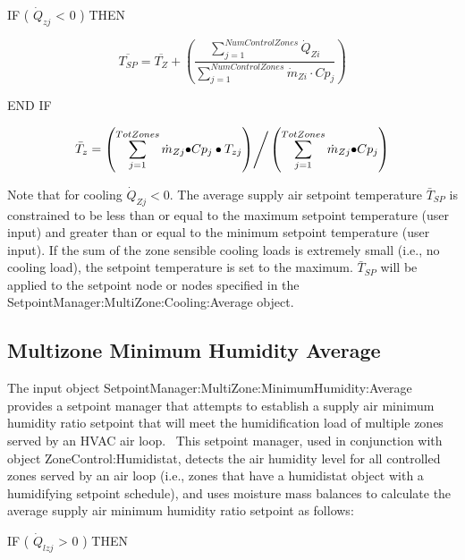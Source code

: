 IF ( \({\dot Q_{zj}}\) \textless{} 0 ) THEN

\begin{equation}
\overline {{T_{SP}}}  = \overline {{T_Z}}  + \left( {\frac{{\sum\limits_{j = 1}^{NumControlZones} {{{\dot Q}_{Zi}}} }}{{\sum\limits_{j = 1}^{NumControlZones} {{{\dot m}_{Zi}}\cdot C{p_j}} }}} \right)
\end{equation}

END IF

\begin{equation}
{\bar T_z} = {{\left( {\sum\limits_{j = 1}^{TotZones} {{{\dot m}_{Zj}} \bullet } C{p_j} \bullet {T_{zj}}} \right)} \mathord{\left/ {\vphantom {{\left( {\sum\limits_{j = 1}^{TotZones} {{{\dot m}_{Zj}} \bullet } C{p_j} \bullet {T_{zj}}} \right)} {\left( {\sum\limits_{j = 1}^{TotZones} {{{\dot m}_{Zj}} \bullet } C{p_j}} \right)}}} \right. } {\left( {\sum\limits_{j = 1}^{TotZones} {{{\dot m}_{Zj}} \bullet } C{p_j}} \right)}}
\end{equation}

Note that for cooling \({\dot Q_{Zj}} < 0.\) The average supply air setpoint temperature \({\bar T_{SP}}\) is constrained to be less than or equal to the maximum setpoint temperature (user input) and greater than or equal to the minimum setpoint temperature (user input). If the sum of the zone sensible cooling loads is extremely small (i.e., no cooling load), the setpoint temperature is set to the maximum. \({\bar T_{SP}}\) will be applied to the setpoint node or nodes specified in the SetpointManager:MultiZone:Cooling:Average object.

\subsection{Multizone Minimum Humidity Average}\label{multizone-minimum-humidity-average}

The input object SetpointManager:MultiZone:MinimumHumidity:Average provides a setpoint manager that attempts to establish a supply air minimum humidity ratio setpoint that will meet the humidification load of multiple zones served by an HVAC air loop.~ This setpoint manager, used in conjunction with object ZoneControl:Humidistat, detects the air humidity level for all controlled zones served by an air loop (i.e., zones that have a humidistat object with a humidifying setpoint schedule), and uses moisture mass balances to calculate the average supply air minimum humidity ratio setpoint as follows:

IF ( \({\dot Q_{lzj}}\) \textgreater{} 0 ) THEN

